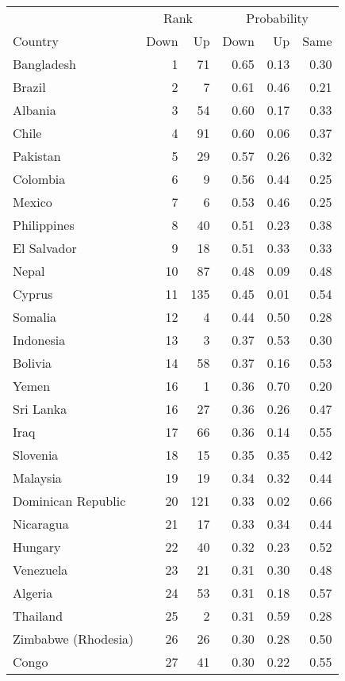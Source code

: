 
\begin{longtable}[t]{lrrrrr}
\toprule
\multicolumn{1}{c}{ } & \multicolumn{2}{c}{Rank} & \multicolumn{3}{c}{Probability} \\
\cmidrule(l{3pt}r{3pt}){2-3} \cmidrule(l{3pt}r{3pt}){4-6}
Country & Down & Up & Down & Up & Same\\
\midrule
Bangladesh & 1 & 71 & 0.65 & 0.13 & 0.30\\
Brazil & 2 & 7 & 0.61 & 0.46 & 0.21\\
Albania & 3 & 54 & 0.60 & 0.17 & 0.33\\
Chile & 4 & 91 & 0.60 & 0.06 & 0.37\\
Pakistan & 5 & 29 & 0.57 & 0.26 & 0.32\\
\addlinespace
Colombia & 6 & 9 & 0.56 & 0.44 & 0.25\\
Mexico & 7 & 6 & 0.53 & 0.46 & 0.25\\
Philippines & 8 & 40 & 0.51 & 0.23 & 0.38\\
El Salvador & 9 & 18 & 0.51 & 0.33 & 0.33\\
Nepal & 10 & 87 & 0.48 & 0.09 & 0.48\\
\addlinespace
Cyprus & 11 & 135 & 0.45 & 0.01 & 0.54\\
Somalia & 12 & 4 & 0.44 & 0.50 & 0.28\\
Indonesia & 13 & 3 & 0.37 & 0.53 & 0.30\\
Bolivia & 14 & 58 & 0.37 & 0.16 & 0.53\\
Yemen & 16 & 1 & 0.36 & 0.70 & 0.20\\
\addlinespace
Sri Lanka & 16 & 27 & 0.36 & 0.26 & 0.47\\
Iraq & 17 & 66 & 0.36 & 0.14 & 0.55\\
Slovenia & 18 & 15 & 0.35 & 0.35 & 0.42\\
Malaysia & 19 & 19 & 0.34 & 0.32 & 0.44\\
Dominican Republic & 20 & 121 & 0.33 & 0.02 & 0.66\\
\addlinespace
Nicaragua & 21 & 17 & 0.33 & 0.34 & 0.44\\
Hungary & 22 & 40 & 0.32 & 0.23 & 0.52\\
Venezuela & 23 & 21 & 0.31 & 0.30 & 0.48\\
Algeria & 24 & 53 & 0.31 & 0.18 & 0.57\\
Thailand & 25 & 2 & 0.31 & 0.59 & 0.28\\
\addlinespace
Zimbabwe (Rhodesia) & 26 & 26 & 0.30 & 0.28 & 0.50\\
Congo & 27 & 41 & 0.30 & 0.22 & 0.55\\

\end{longtable}
